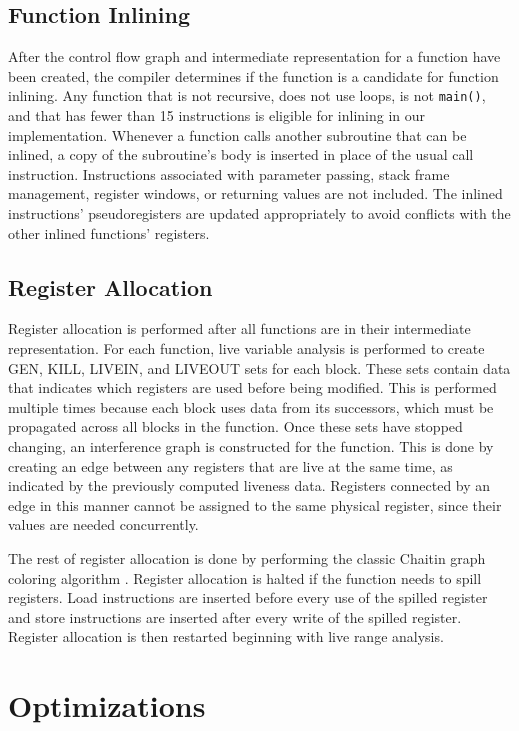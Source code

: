 \documentclass[12pt]{article}
\begin{document}
\subsection{Function Inlining}
After the control flow graph and intermediate representation for a function have been created, the compiler determines if the function is a candidate for function inlining.
Any function that is not recursive, does not use loops, is not {\tt main()}, and that has fewer than 15 instructions is eligible for inlining in our implementation.
Whenever a function calls another subroutine that can be inlined, a copy of the subroutine's body is inserted in place of the usual call instruction.
Instructions associated with parameter passing, stack frame management, register windows, or returning values are not included.
The inlined instructions' pseudoregisters are updated appropriately to avoid conflicts with the other inlined functions' registers.

\subsection{Register Allocation}
Register allocation is performed after all functions are in their intermediate representation.
For each function, live variable analysis is performed to create GEN, KILL, LIVEIN, and LIVEOUT sets for each block.
These sets contain data that indicates which registers are used before being modified.
This is performed multiple times because each block uses data from its successors, which must be propagated across all blocks in the function.
Once these sets have stopped changing, an interference graph is constructed for the function.
This is done by creating an edge between any registers that are live at the same time, as indicated by the previously computed liveness data.
Registers connected by an edge in this manner cannot be assigned to the same physical register, since their values are needed concurrently.

The rest of register allocation is done by performing the classic Chaitin graph coloring algorithm \cite{chaitin}.
Register allocation is halted if the function needs to spill registers.
Load instructions are inserted before every use of the spilled register and store instructions are inserted after every write of the spilled register.
Register allocation is then restarted beginning with live range analysis.

\section{Optimizations}
\end{document}
